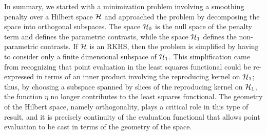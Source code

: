 In summary, we started with a minimization problem involving a smoothing penalty over a Hilbert space $\mathcal{H}$ and approached the problem by decomposing the space into orthogonal subspaces. The space $\mathcal{H}_0$ is the null space of the penalty term and defines the parametric contrasts, while the space $\mathcal{H}_1$ defines the non-parametric contrasts. If $\mathcal{H}$ is an RKHS, then the problem is simplified by having to consider only a finite dimensional subspace of $\mathcal{H}_1$. This simplification came from recognizing that point evaluation in the least squares functional could be re-expressed in terms of an inner product involving the reproducing kernel on $\mathcal{H}_1$; thus, by choosing a subspace spanned by slices of the reproducing kernel on $\mathcal{H}_1$, the function $\eta$ no longer contributes to the least squares functional. The geometry of the Hilbert space, namely orthogonality, plays a critical role in this type of result, and it is precisely continuity of the evaluation functional that allows point evaluation to be cast in terms of the geometry of the space.
%
%
%
%
%
%

